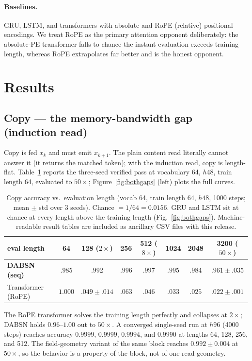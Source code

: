 \documentclass[11pt]{article}
\newcommand{\model}{DABSN}
\begin{document}
\paragraph{Baselines.} GRU, LSTM, and transformers with absolute and RoPE
(relative) positional encodings. We treat RoPE as the primary attention
opponent deliberately: the absolute-PE transformer falls to chance the
instant evaluation exceeds training length, whereas RoPE extrapolates far
better and is the honest opponent.

\section{Results}

\subsection{Copy --- the memory-bandwidth gap (induction read)}
\label{sec:copy}

Copy is fed $x_k$ and must emit $x_{k+1}$. The plain content read literally
cannot answer it (it returns the matched token); with the induction read,
copy is length-flat. Table~\ref{tab:copy} reports the three-seed verified
pass at vocabulary 64, $h48$, train length 64, evaluated to $50\times$;
Figure~\ref{fig:bothgaps} (left) plots the full curves.

\begin{table}[t]
\centering
\caption{Copy accuracy vs.\ evaluation length (vocab 64, train length 64,
$h48$, 1000 steps; mean $\pm$ std over 3 seeds). Chance $= 1/64 = 0.0156$.
GRU and LSTM sit at chance at every length above the training length
(Fig.~\ref{fig:bothgaps}). Machine-readable result tables are included as
ancillary CSV files with this release.}
\label{tab:copy}
\small
\begin{tabular}{lccccccc}
\toprule
eval length & 64 & 128 ($2\times$) & 256 & 512 ($8\times$) & 1024 & 2048 & 3200 ($50\times$) \\
\midrule
\textbf{\model{} (seq)} & $.985$ & $.992$ & $.996$ & $.997$ & $.995$ & $.984$ & $\mathbf{.961 \pm .035}$ \\
Transformer (RoPE) & $1.000$ & $.049 \pm .014$ & $.063$ & $.046$ & $.033$ & $.025$ & $.022 \pm .001$ \\
\bottomrule
\end{tabular}
\end{table}

The RoPE transformer solves the training length perfectly and collapses at
$2\times$; \model{} holds $0.96$--$1.00$ out to $50\times$. A converged
single-seed run at $h96$ (4000 steps) reaches accuracy $0.9999$, $0.9999$,
$0.9994$, and $0.9990$ at lengths 64, 128, 256, and 512. The
field-geometry variant of the same block reaches
$0.992 \pm 0.004$ at $50\times$, so the behavior is a property of the block,
not of one read geometry.
\end{document}

